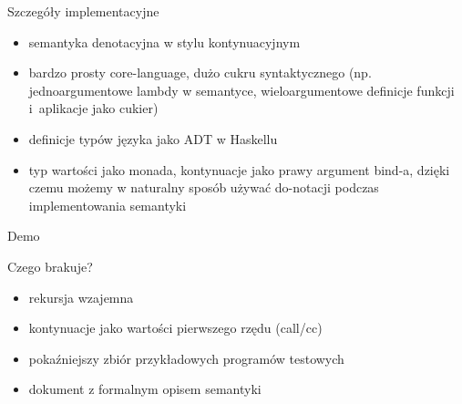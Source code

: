\documentclass[12pt,serif]{beamer}
\begin{document}
\begin{frame}{Szczegóły implementacyjne}
\begin{itemize}
  \item semantyka denotacyjna w stylu kontynuacyjnym
  \item bardzo prosty core-language, dużo cukru syntaktycznego
        (np. jednoargumentowe lambdy w semantyce,
        wieloargumentowe definicje funkcji i~aplikacje jako cukier)
  \item definicje typów języka jako ADT w Haskellu
  \item typ wartości jako monada, kontynuacje jako prawy argument bind-a,
        dzięki czemu możemy w naturalny sposób używać do-notacji podczas
        implementowania semantyki
\end{itemize}
\end{frame}

\begin{frame}
\begin{center}
   \LARGE{Demo}
\end{center}
\end{frame}

\begin{frame}{Czego brakuje?}
\begin{itemize}
   \item rekursja wzajemna
   \item kontynuacje jako wartości pierwszego rzędu (call/cc)
   \item pokaźniejszy zbiór przykładowych programów testowych
   \item dokument z formalnym opisem semantyki
\end{itemize}
\end{frame}
\end{document}
